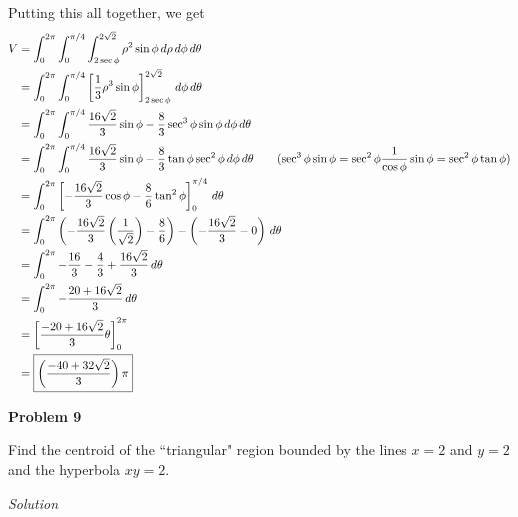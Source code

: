 \documentclass{article}
\newcommand{\lrp}[1]{\left( #1 \right)}
\newcommand{\lrb}[1]{\left[ #1 \right]}
\newcommand{\Solution}{\textit{Solution}}
\begin{document}
Putting this all together, we get
\begin{align*}
    V&=\int_0^{2\pi}\int_0^{\pi/4}\int_{2\sec\phi}^{2\sqrt{2}}\rho^2\sin\phi \,d\rho\,d\phi\,d\theta\\
    &=\int_0^{2\pi}\int_0^{\pi/4}\lrb{\frac{1}{3}\rho^3\sin\phi}_{2\sec\phi}^{2\sqrt{2}}\,d\phi\,d\theta\\
    &=\int_0^{2\pi}\int_0^{\pi/4} \frac{16\sqrt{2}}{3}\sin\phi -\frac{8}{3}\sec^3\phi\sin\phi \,d\phi\,d\theta\\
    &=\int_0^{2\pi}\int_0^{\pi/4} \frac{16\sqrt{2}}{3}\sin\phi -\frac{8}{3}\tan\phi \sec^2\phi \,d\phi\,d\theta\tag{$\displaystyle \sec^3\phi\sin\phi =\sec^2\phi \frac{1}{\cos\phi}\sin\phi=\sec^2\phi\tan\phi$}\\
    &=\int_0^{2\pi}\lrb{-\frac{16\sqrt{2}}{3}\cos\phi-\frac{8}{6}\tan^2\phi}_0^{\pi/4}\,d\theta\\
    &=\int_0^{2\pi}\lrp{-\frac{16\sqrt{2}}{3}\lrp{\frac{1}{\sqrt{2}}}-\frac{8}{6}}-\lrp{-\frac{16\sqrt{2}}{3}-0}\,d\theta\\
    &=\int_0^{2\pi} -\frac{16}{3}-\frac{4}{3}+\frac{16\sqrt{2}}{3}\,d\theta\\
    &=\int_0^{2\pi}-\frac{20+16\sqrt{2}}{3}\,d\theta\\
&=\lrb{\frac{-20+16\sqrt{2}}{3}\theta}_0^{2\pi}\\
    &=\boxed{\lrp{\frac{-40+32\sqrt{2}}{3}}\pi}
\end{align*}
{}\textbf{Problem 9}

Find the centroid of the ``triangular" region bounded by the lines $x=2$ and $y=2$ and the hyperbola $xy=2$.

\Solution
\end{document}

